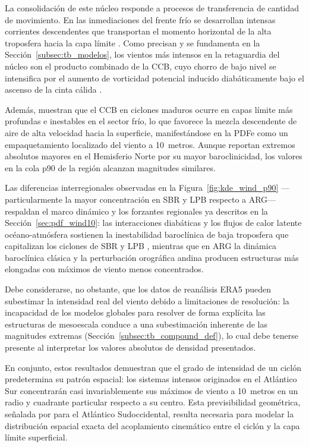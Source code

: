 La consolidación de este núcleo responde a procesos de transferencia de cantidad de movimiento. 
En las inmediaciones del frente frío se desarrollan intensas corrientes descendentes que transportan el momento horizontal de la alta troposfera hacia la capa límite \citep{hyeok2024extrem}. 
Como precisan \citet{martinez2014cold} y se fundamenta en la Sección~\ref{subsec:tb_modelos}, los vientos más intensos en la retaguardia del núcleo son el producto combinado de la CCB, cuyo chorro de bajo nivel se intensifica por el aumento de vorticidad potencial inducido diabáticamente bajo el ascenso de la cinta cálida \citep{schemm2014linkage, blanchard2021warm}. 

Además, \citet{gentile2023observed} muestran que el CCB en ciclones maduros ocurre en capas límite más profundas e inestables en el sector frío, lo que favorece la mezcla descendente de aire de alta velocidad hacia la superficie, manifestándose en la PDFe como un empaquetamiento localizado del viento a 10~metros. Aunque \citet{stankovic2025surface} reportan extremos absolutos mayores en el Hemisferio Norte por su mayor baroclinicidad, los valores en la cola p90 de la región alcanzan magnitudes similares.

Las diferencias interregionales observadas en la Figura~\ref{fig:kde_wind_p90} ---particularmente la mayor concentración en SBR y LPB respecto a ARG--- respaldan el marco dinámico y los forzantes regionales ya descritos en la Sección~\ref{sec:pdf_wind10}: las interacciones diabáticas y los flujos de calor latente océano-atmósfera \citep{reboita2018extratropical} sostienen la inestabilidad baroclínica de baja troposfera que capitalizan los ciclones de SBR y LPB \citep{andrade2024composite, coutodesouza2024thesis}, mientras que en ARG la dinámica baroclínica clásica y la perturbación orográfica andina producen estructuras más elongadas con máximos de viento menos concentrados.

Debe considerarse, no obstante, que los datos de reanálisis ERA5 pueden subestimar la intensidad real del viento debido a limitaciones de resolución: la incapacidad de los modelos globales para resolver de forma explícita las estructuras de mesoescala conduce a una subestimación inherente de las magnitudes extremas \citep{hodges2011comparison, priestley2022improved} (Sección~\ref{subsec:tb_compound_def}), lo cual debe tenerse presente al interpretar los valores absolutos de densidad presentados.

En conjunto, estos resultados demuestran que el grado de intensidad de un ciclón predetermina su patrón espacial: los sistemas intensos originados en el Atlántico Sur concentrarán casi invariablemente sus máximos de viento a 10~metros en un radio y cuadrante particular respecto a su centro. Esta previsibilidad geométrica, señalada por \citet{dalanhese2023new} para el Atlántico Sudoccidental, resulta necesaria para modelar la distribución espacial exacta del acoplamiento cinemático entre el ciclón y la capa límite superficial.
